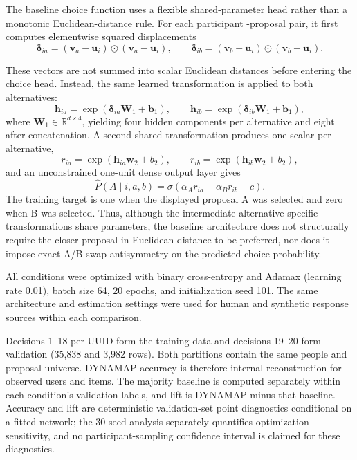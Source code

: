 \documentclass[unnumsec,webpdf,modern,large]{oup-authoring-template}
\begin{document}
The baseline choice function uses a flexible shared-parameter head rather than a monotonic Euclidean-distance rule. For each participant -proposal pair, it first computes elementwise squared displacements
\[
\boldsymbol{\delta}_{ia}
=
(\mathbf{v}_a-\mathbf{u}_i)\odot
(\mathbf{v}_a-\mathbf{u}_i),
\qquad
\boldsymbol{\delta}_{ib}
=
(\mathbf{v}_b-\mathbf{u}_i)\odot
(\mathbf{v}_b-\mathbf{u}_i).
\]

These vectors are not summed into scalar Euclidean distances before entering the choice head. Instead, the same learned transformation is applied to both alternatives:
\[
\mathbf{h}_{ia}
=
\exp(\boldsymbol{\delta}_{ia}\mathbf{W}_1+\mathbf{b}_1),
\qquad
\mathbf{h}_{ib}
=
\exp(\boldsymbol{\delta}_{ib}\mathbf{W}_1+\mathbf{b}_1),
\]
where $\mathbf{W}_1\in\mathbb{R}^{d\times4}$, yielding four hidden components per alternative and eight after concatenation. A second shared transformation produces one scalar per alternative,
\[
r_{ia}=\exp(\mathbf{h}_{ia}\mathbf{w}_2+b_2),
\qquad
r_{ib}=\exp(\mathbf{h}_{ib}\mathbf{w}_2+b_2),
\]
and an unconstrained one-unit dense output layer gives
\[
\widehat P(A\mid i,a,b)
=
\sigma(\alpha_A r_{ia}+\alpha_B r_{ib}+c).
\]
The training target is one when the displayed proposal A was selected and zero when B was selected. Thus, although the intermediate alternative-specific transformations share parameters, the baseline architecture does not structurally require the closer proposal in Euclidean distance to be preferred, nor does it impose exact A/B-swap antisymmetry on the predicted choice probability.

All conditions were optimized with binary cross-entropy and Adamax (learning rate 0.01), batch size 64, 20 epochs, and initialization seed 101. The same architecture and estimation settings were used for human and synthetic response sources within each comparison.


Decisions 1--18 per UUID form the training data and decisions 19--20 form validation (35,838 and 3,982 rows). Both partitions contain the same people and proposal universe. DYNAMAP accuracy is therefore internal reconstruction for observed users and items. The majority baseline is computed separately within each condition's validation labels, and lift is DYNAMAP minus that baseline. Accuracy and lift are deterministic validation-set point diagnostics conditional on a fitted network; the 30-seed analysis separately quantifies optimization sensitivity, and no participant-sampling confidence interval is claimed for these diagnostics.
\end{document}
